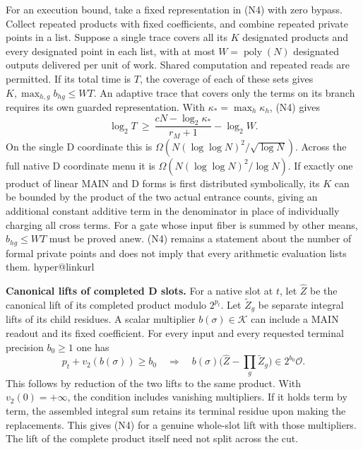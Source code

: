\documentclass[
  11pt,
]{article}
\makeatletter
\newcommand{\PaperSixCatalogue}[1]{\csname hyper@linkurl\endcsname{#1}{EVIDENCE_CATALOG.md}}
\newcommand{\PaperSixEvidence}[2]{\PaperSixCatalogue{#2}}
\makeatother
\begin{document}
For an execution bound, take a fixed representation in (N4) with zero
bypass. Collect repeated products with fixed coefficients, and combine
repeated private points in a list. Suppose a single trace covers all its
\(K\) designated products and every designated point in each list, with
at most \(W=\operatorname{poly}(N)\) designated outputs delivered per
unit of work. Shared computation and repeated reads are permitted. If
its total time is \(T\), the coverage of each of these sets gives
\(K,\max_{h,g} b_{hg}\le WT\). An adaptive trace that covers only the
terms on its branch requires its own guarded representation. With
\(\kappa_*=\max_h\kappa_h\), (N4) gives \[
 \log_2 T\ \ge\ \frac{cN-\log_2\kappa_*}{r_M+1}-\log_2 W.
\tag{N5}
\] On the single D coordinate this is
\(\Omega(N(\log\log N)^2/\sqrt{\log N})\). Across the full native D
coordinate menu it is \(\Omega(N(\log\log N)^2/\log N)\). If exactly one
product of linear MAIN and D forms is first distributed symbolically,
its \(K\) can be bounded by the product of the two actual entrance
counts, giving an additional constant additive term in the denominator
in place of individually charging all cross terms. For a gate whose
input fiber is summed by other means, \(b_{hg}\le WT\) must be proved
anew. (N4) remains a statement about the number of formal private points
and does not imply that every arithmetic evaluation lists them.
\PaperSixEvidence{evidence/research_v7/source/cost_contracts.md}{v7 execution contract}

\textbf{Canonical lifts of completed D slots.} For a native slot at
\(t\), let \(\widehat Z\) be the canonical lift of its completed product
modulo \(2^{p_t}\). Let \(\widetilde Z_g\) be separate integral lifts of
its child residues. A scalar multiplier \(b(\sigma)\in\mathcal K\) can
include a MAIN readout and its fixed coefficient. For every input and
every requested terminal precision \(b_0\ge1\) one has \[
 p_t+v_2(b(\sigma))\ge b_0
 \quad\Longrightarrow\quad
 b(\sigma)\bigl(\widehat Z-\textstyle\prod_g\widetilde Z_g\bigr)
                          \in 2^{b_0}\mathcal O.
\] This follows by reduction of the two lifts to the same product. With
\(v_2(0)=+\infty\), the condition includes vanishing multipliers. If it
holds term by term, the assembled integral sum retains its terminal
residue upon making the replacements. This gives (N4) for a genuine
whole-slot lift with those multipliers. The lift of the complete product
itself need not split across the cut.
\end{document}
